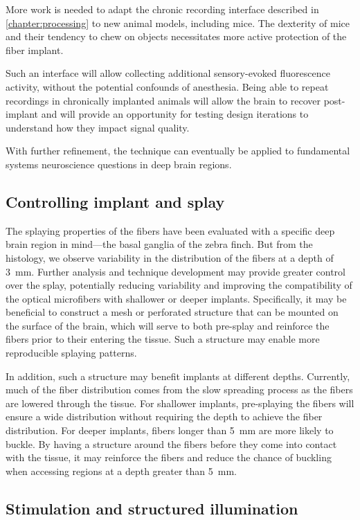 More work is needed to adapt the chronic recording 
interface described in \cref{chapter:processing} to 
new animal models, including mice. The dexterity of  
mice and their tendency to chew on objects necessitates 
more active protection of the fiber implant.

Such an interface will allow collecting additional 
sensory-evoked fluorescence activity, without the 
potential confounds of anesthesia. Being able to 
repeat recordings in chronically implanted animals 
will allow the brain to recover post-implant and will 
provide an opportunity for testing design iterations 
to understand how they impact signal quality.

With further refinement, the technique can eventually 
be applied to fundamental systems neuroscience 
questions in deep brain regions.

\subsection{Controlling implant and splay}

The splaying properties of the fibers have been 
evaluated with a specific deep brain region 
in mind---the basal ganglia of the zebra finch.
But from the histology, we observe variability 
in the distribution of the fibers at a depth of 
3~mm. Further analysis and technique development 
may provide greater control over the splay, 
potentially reducing variability and improving 
the compatibility of the optical microfibers with 
shallower or deeper implants. Specifically, it 
may be beneficial to construct a mesh or perforated 
structure that can be mounted on the surface of the 
brain, which will serve to both pre-splay and reinforce 
the fibers prior to their entering the tissue. Such a structure 
may enable more reproducible splaying patterns. 

In addition, such a structure may 
benefit implants at different depths. Currently, 
much of the fiber distribution comes from the slow 
spreading process as the fibers are lowered through
the tissue. For shallower implants, pre-splaying the fibers 
will ensure a wide distribution without requiring 
the depth to achieve the fiber distribution. 
For deeper implants, fibers longer than 5~mm are 
more likely to buckle. By having a structure around 
the fibers before they come into contact with the 
tissue, it may reinforce the fibers and reduce the 
chance of buckling when accessing regions at a depth 
greater than 5~mm.

\subsection{Stimulation and structured illumination}

